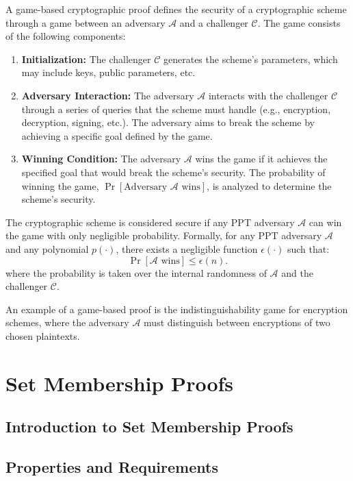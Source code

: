 \documentclass{iacrcc}
\begin{document}
\begin{definition}
A game-based cryptographic proof defines the security of a cryptographic scheme through a game between an adversary $\mathcal{A}$ and a challenger $\mathcal{C}$. The game consists of the following components:
\begin{enumerate}
\item \textbf{Initialization:} The challenger $\mathcal{C}$ generates the scheme's parameters, which may include keys, public parameters, etc.
\item \textbf{Adversary Interaction:} The adversary $\mathcal{A}$ interacts with the challenger $\mathcal{C}$ through a series of queries that the scheme must handle (e.g., encryption, decryption, signing, etc.). The adversary aims to break the scheme by achieving a specific goal defined by the game.
\item \textbf{Winning Condition:} The adversary $\mathcal{A}$ wins the game if it achieves the specified goal that would break the scheme's security. The probability of winning the game, $\Pr[\text{Adversary } \mathcal{A} \text{ wins}]$, is analyzed to determine the scheme's security.
\end{enumerate}
The cryptographic scheme is considered secure if any PPT adversary $\mathcal{A}$ can win the game with only negligible probability. Formally, for any PPT adversary $\mathcal{A}$ and any polynomial $p(\cdot)$, there exists a negligible function $\epsilon(\cdot)$ such that:
\[
\Pr[\mathcal{A} \text{ wins}] \leq \epsilon(n).
\]
where the probability is taken over the internal randomness of $\mathcal{A}$ and the challenger $\mathcal{C}$.
\end{definition}

An example of a game-based proof is the indistinguishability game for encryption schemes, where the adversary $\mathcal{A}$ must distinguish between encryptions of two chosen plaintexts.

\section{Set Membership Proofs}
\subsection{Introduction to Set Membership Proofs}
\subsection{Properties and Requirements}
\end{document}
